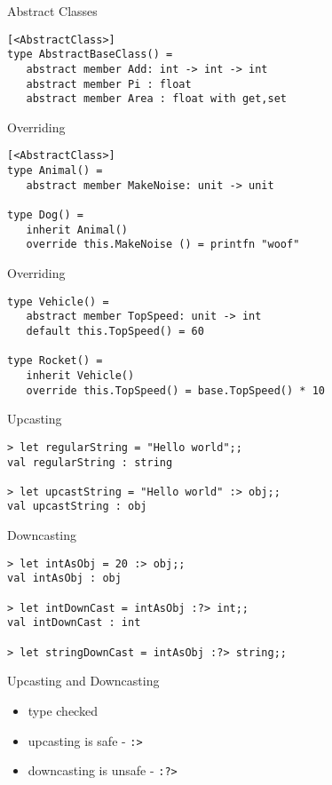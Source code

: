 \documentclass{beamer}
\begin{document}
\begin{frame}[fragile]{Abstract Classes}
  \begin{verbatim}
[<AbstractClass>]
type AbstractBaseClass() =
   abstract member Add: int -> int -> int
   abstract member Pi : float 
   abstract member Area : float with get,set
  \end{verbatim}
\end{frame}

\begin{frame}[fragile]{Overriding}
  \begin{verbatim}
[<AbstractClass>]
type Animal() =
   abstract member MakeNoise: unit -> unit

type Dog() =
   inherit Animal()
   override this.MakeNoise () = printfn "woof"
  \end{verbatim}
\end{frame}

\begin{frame}[fragile]{Overriding}
  \begin{verbatim}
type Vehicle() =
   abstract member TopSpeed: unit -> int
   default this.TopSpeed() = 60

type Rocket() =
   inherit Vehicle()
   override this.TopSpeed() = base.TopSpeed() * 10
  \end{verbatim}
\end{frame}

\begin{frame}[fragile]{Upcasting}
  \begin{verbatim}
> let regularString = "Hello world";;
val regularString : string

> let upcastString = "Hello world" :> obj;;
val upcastString : obj
  \end{verbatim}
\end{frame}

\begin{frame}[fragile]{Downcasting}
  \begin{verbatim}
> let intAsObj = 20 :> obj;;
val intAsObj : obj

> let intDownCast = intAsObj :?> int;;
val intDownCast : int

> let stringDownCast = intAsObj :?> string;;
  \end{verbatim}
\end{frame}

\begin{frame}{Upcasting and Downcasting}
  \begin{itemize}
    \item type checked
    \item upcasting is safe - \texttt{:>}
    \item downcasting is unsafe - \texttt{:?>}
  \end{itemize}
\end{frame}
\end{document}
